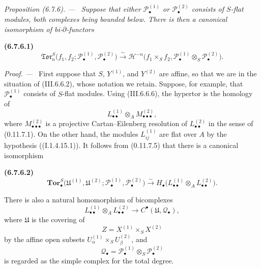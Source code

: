 \documentclass[10pt,oneside]{book}
\newcommand{\sh}[1]{\mathscr{#1}}
\newcommand{\sref}[2][]{(#2)}
\newcommand{\oldpage}[2][]{\setcounter{footnote}{0}\marginpar{\scriptsize\textbf{#1}~|~#2}\ignorespaces}
\newenvironment{env}[1][]{\par\medskip\noindent\textbf{(#1)}\ }{\par}
\newenvironment{proposition}[1][]{\par\medskip\noindent\itshape Proposition (#1). ---\ }{\par}
\newenvironment{proof}{\par\medskip\noindent\textit{Proof. ---\ }}{\par}
\begin{document}
\begin{proposition}[6.7.6]
\label{III.6.7.6}
Suppose that either $\sh P_\bullet^{(1)}$ or
$\sh P_\bullet^{(2)}$ consists of $S$-flat modules, both
complexes being bounded below.  There is then a canonical
isomorphism of bi-$\partial$-functors
\begin{env}[6.7.6.1]
\label{III.6.7.6.1}
\[
  \mathfrak{Tor}_n^S
  \bigl(
    f_1,f_2;
    \sh P_\bullet^{(1)},\sh P_\bullet^{(2)}
  \bigr)
  \xrightarrow{\sim}
  \sh H^{-n}
  \bigl(
    f_1\times_Sf_2,
    \sh P_\bullet^{(1)}
    \otimes_S\sh P_\bullet^{(2)}
  \bigr).
  \tag{6.7.6.1}\label{III.6.7.6.1.eq}
\]
\end{env}
\end{proposition}

\begin{proof}
First suppose that $S$, $Y^{(1)}$, and $Y^{(2)}$ are affine, so
that we are in the situation of \sref{III.6.6.2}, whose notation
we retain.  Suppose, for example, that
$\sh P_\bullet^{(1)}$ consists of $S$-flat modules.  Using
\sref{III.6.6.6}, the hypertor is the homology of
\[
  L_{\bullet\bullet}^{(1)}
  \otimes_A M_{\bullet\bullet\bullet}^{(2)},
\]
where $M_{\bullet\bullet\bullet}^{(2)}$ is a projective
Cartan--Eilenberg resolution of $L_{\bullet\bullet}^{(2)}$ in
the sense of \sref[0]{0.11.7.1}.  On the other hand, the modules
$L_{ij}^{(1)}$ are flat over $A$ by the hypothesis
(\sref[I]{I.1.4.15.1}).  It follows from
\sref[0]{0.11.7.5} that there is a canonical isomorphism
\begin{env}[6.7.6.2]
\label{III.6.7.6.2}
\[
  \mathbf{Tor}_\bullet^S
  \bigl(
    \mathfrak U^{(1)},\mathfrak U^{(2)};
    \sh P_\bullet^{(1)},\sh P_\bullet^{(2)}
  \bigr)
  \xrightarrow{\sim}
  H_\bullet
  \bigl(
    L_{\bullet\bullet}^{(1)}
    \otimes_A L_{\bullet\bullet}^{(2)}
  \bigr).
  \tag{6.7.6.2}\label{III.6.7.6.2.eq}
\]
\end{env}

There is also a natural homomorphism of bicomplexes
\[
  L_{\bullet\bullet}^{(1)}
  \otimes_A L_{\bullet\bullet}^{(2)}
  \longrightarrow
  C^\bullet(\mathfrak U,\sh Q_\bullet),
\]
where $\mathfrak U$ is the covering of
\[
  Z=X^{(1)}\times_SX^{(2)}
\]
by the affine open subsets
$U_\alpha^{(1)}\times_SU_\beta^{(2)}$, and
\[
  \sh Q_\bullet
  =
  \sh P_\bullet^{(1)}
  \otimes_S\sh P_\bullet^{(2)}
\]
is regarded as the simple complex for the total degree.

\oldpage[III]{161}


\end{proof}
\end{document}
